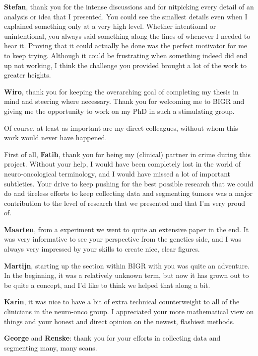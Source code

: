 \textbf{Stefan}, thank you for the intense discussions and for nitpicking every detail of an analysis or idea that I presented.
You could see the smallest details even when I explained something only at a very high level.
Whether intentional or unintentional, you always said something along the lines of  whenever I needed to hear it.
Proving that it could actually be done was the perfect motivator for me to keep trying.
Although it could be frustrating when something indeed did end up not working, I think the challenge you provided brought a lot of the work to greater heights.

\textbf{Wiro}, thank you for keeping the overarching goal of completing my thesis in mind and steering where necessary.
Thank you for welcoming me to BIGR and giving me the opportunity to work on my PhD in such a stimulating group.

Of course, at least as important are my direct colleagues, without whom this work would never have happened.

First of all, \textbf{Fatih}, thank you for being my (clinical) partner in crime during this project.
Without your help, I would have been completely lost in the world of neuro-oncological terminology, and I would have missed a lot of important subtleties.
Your drive to keep pushing for the best possible research that we could do and tireless efforts to keep collecting data and segmenting tumors was a major contribution to the level of research that we presented and that I'm very proud of.

\textbf{Maarten}, from a  experiment we went to quite an extensive paper in the end.
It was very informative to see your perspective from the genetics side, and I was always very impressed by your skills to create nice, clear figures.

\textbf{Martijn}, starting up the  section within BIGR with you was quite an adventure.
In the beginning, it was a relatively unknown term, but now it has grown out to be quite a concept, and I'd like to think we helped that along a bit.

\textbf{Karin}, it was nice to have a bit of extra technical counterweight to all of the clinicians in the neuro-onco group.
I appreciated your more mathematical view on things and your honest and direct opinion on the newest, flashiest methods.

\textbf{George} and \textbf{Renske}: thank you for your efforts in collecting data and segmenting many, many scans.

